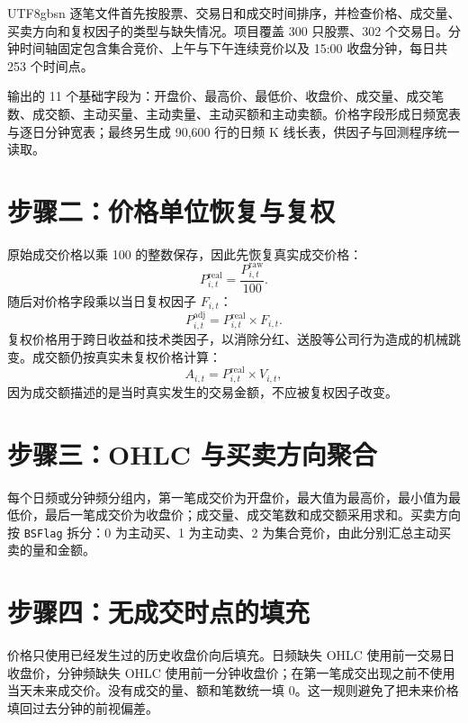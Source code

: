 \documentclass[a4paper,11pt,openany]{report}
\newcommand{\code}[1]{\texttt{#1}}
\begin{document}
\begin{CJK*}{UTF8}{gbsn}
逐笔文件首先按股票、交易日和成交时间排序，并检查价格、成交量、买卖方向和复权因子的类型与缺失情况。项目覆盖 300 只股票、302 个交易日。分钟时间轴固定包含集合竞价、上午与下午连续竞价以及 15:00 收盘分钟，每日共 253 个时间点。

输出的 11 个基础字段为：开盘价、最高价、最低价、收盘价、成交量、成交笔数、成交额、主动买量、主动卖量、主动买额和主动卖额。价格字段形成日频宽表与逐日分钟宽表；最终另生成 90,600 行的日频 K 线长表，供因子与回测程序统一读取。

\section{步骤二：价格单位恢复与复权}

原始成交价格以乘 100 的整数保存，因此先恢复真实成交价格：
\begin{equation}
P^{\mathrm{real}}_{i,t}=\frac{P^{\mathrm{raw}}_{i,t}}{100}.
\end{equation}
随后对价格字段乘以当日复权因子 $F_{i,t}$：
\begin{equation}
P^{\mathrm{adj}}_{i,t}=P^{\mathrm{real}}_{i,t}\times F_{i,t}.
\end{equation}
复权价格用于跨日收益和技术类因子，以消除分红、送股等公司行为造成的机械跳变。成交额仍按真实未复权价格计算：
\begin{equation}
A_{i,t}=P^{\mathrm{real}}_{i,t}\times V_{i,t},
\end{equation}
因为成交额描述的是当时真实发生的交易金额，不应被复权因子改变。

\section{步骤三：OHLC 与买卖方向聚合}

每个日频或分钟频分组内，第一笔成交价为开盘价，最大值为最高价，最小值为最低价，最后一笔成交价为收盘价；成交量、成交笔数和成交额采用求和。买卖方向按 \code{BSFlag} 拆分：0 为主动买、1 为主动卖、2 为集合竞价，由此分别汇总主动买卖的量和金额。

\section{步骤四：无成交时点的填充}

价格只使用已经发生过的历史收盘价向后填充。日频缺失 OHLC 使用前一交易日收盘价，分钟频缺失 OHLC 使用前一分钟收盘价；在第一笔成交出现之前不使用当天未来成交价。没有成交的量、额和笔数统一填 0。这一规则避免了把未来价格填回过去分钟的前视偏差。


\end{CJK*}
\end{document}
